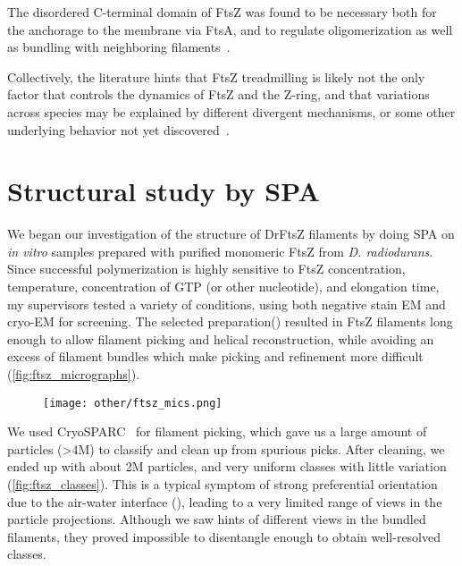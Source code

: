 The disordered C-terminal domain of FtsZ was found to be necessary both for the anchorage to the membrane via FtsA, and to regulate oligomerization as well as bundling with neighboring filaments~\cite{barrowsFtsZDynamicsBacterial2021}.

Collectively, the literature hints that FtsZ treadmilling is likely not the only factor that controls the dynamics of FtsZ and the Z-ring, and that variations across species may be explained by different divergent mechanisms, or some other underlying behavior not yet discovered~\cite{barrowsFtsZDynamicsBacterial2021}.

\section{Structural study by SPA}

We began our investigation of the structure of DrFtsZ filaments by doing SPA on \textit{in vitro} samples prepared with purified monomeric FtsZ from \textit{D. radiodurans}.
Since successful polymerization is highly sensitive to FtsZ concentration, temperature, concentration of GTP (or other nucleotide), and elongation time, my supervisors tested a variety of conditions, using both negative stain EM and cryo-EM for screening.
The selected preparation() resulted in FtsZ filaments long enough to allow filament picking and helical reconstruction, while avoiding an excess of filament bundles which make picking and refinement more difficult (\autoref{fig:ftsz_micrographs}).

\begin{figure}[ht]
    \centering
    \texttt{[image: other/ftsz\_mics.png]}
    \label{fig:ftsz_micrographs}
\end{figure}

We used CryoSPARC~\cite{punjaniCryoSPARCAlgorithmsRapid2017} for filament picking, which gave us a large amount of particles (>4M) to classify and clean up from spurious picks.
After cleaning, we ended up with about 2M particles, and very uniform classes with little variation (\autoref{fig:ftsz_classes}).
This is a typical symptom of strong preferential orientation due to the air-water interface (), leading to a very limited range of views in the particle projections.
Although we saw hints of different views in the bundled filaments, they proved impossible to disentangle enough to obtain well-resolved classes.

